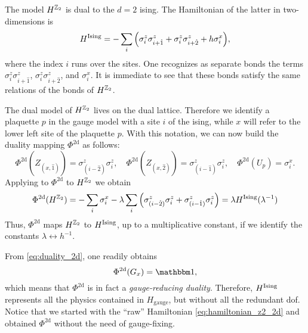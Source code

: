 The model $H^{\mathbb{Z}_2}$ is dual to the $d=2$ \ac{ising}.
The Hamiltonian of the latter in two-dimensions is
\begin{equation}
    H^{\text{Ising}} =
    - \sum_{i} \qty(
        \sigma^z_i \sigma^z_{i+\hat{1}} +
        \sigma^z_i \sigma^z_{i+\hat{2}} +
        h \sigma^x_i
    ),
\end{equation}
where the index $i$ runs over the sites.
One recognizes as separate bonds the terms $\sigma^z_i \sigma^z_{i+\hat{1}}$, $\sigma^z_i \sigma^z_{i+\hat{2}}$, and $\sigma^x_i$.
It is immediate to see that these bonds satisfy the same relations of the bonds of $H^{\mathbb{Z}_2}$.

The dual model of $H^{\mathbb{Z}_2}$ lives on the dual lattice.
Therefore we identify a plaquette $p$ in the gauge model with a site $i$ of the \ac{ising}, while $x$ will refer to the lower left site of the plaquette $p$.
With this notation, we can now build the duality mapping $\Phi^{\text{2d}}$ as follows:
\begin{equation}
    \Phi^{\text{2d}}(Z_{(x, \hat{1})} )  = \sigma^z_{(i-\hat{2})} \sigma^z_i, \quad
    \Phi^{\text{2d}}(Z_{(x, \hat{2})} )  = \sigma^z_{(i-\hat{1})} \sigma^z_i, \quad
    \Phi^{\text{2d}}(U_p) = \sigma^x_i.
    \label{eq:duality_2d}
\end{equation}
Applying to $\Phi^{\text{2d}}$ to $H^{\mathbb{Z}_2}$ we obtain
\begin{equation*}
    \Phi^{\text{2d}} (H^{\mathbb{Z}_2}) =
    - \sum_{i} \sigma^x_i - \lambda \sum_{i} \qty(
        \sigma^z_{(i-\hat{2})} \sigma^z_i +
        \sigma^z_{(i-\hat{1})} \sigma^z_i
    ) =
    \lambda H^{\text{Ising}}(\lambda^{-1})
\end{equation*}
Thus, $\Phi^{\text{2d}}$ maps $H^{\mathbb{Z}_2}$ to $H^{\text{Ising}}$, up to a multiplicative constant, if we identify the constants $\lambda \leftrightarrow h^{-1}$.

From \eqref{eq:duality_2d}, one readily obtains
\begin{equation*}
    \Phi^{\text{2d}}(G_x) = \identity,
\end{equation*}
which means that $\Phi^{\text{2d}}$ is in fact a \emph{gauge-reducing duality}.
Therefore, $H^{\text{Ising}}$ represents all the physics contained in $H_{\text{gauge}}$, but without all the redundant \ac{dof}.
Notice that we started with the ``raw'' Hamiltonian \eqref{eq:hamiltonian_z2_2d} and obtained $\Phi^{\text{2d}}$ without the need of gauge-fixing.

